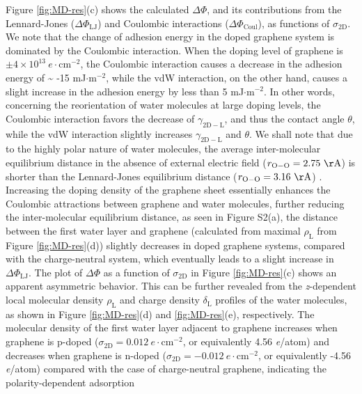 \documentclass[journal=langd5,manuscript=article,email=true,hyperref=true,keywords=true]{achemso}
\begin{document}
Figure \ref{fig:MD-res}(c) shows the calculated \(\Delta \Phi\), and
its contributions from the Lennard-Jones (\(\Delta \Phi_{\mathrm{LJ}}\))
and Coulombic interactions (\(\Delta \Phi_{\mathrm{Coul}}\)), as
functions of \(\sigma_{\mathrm{2D}}\). We note that the change of
adhesion energy in the doped graphene system is dominated by the
Coulombic interaction. When the doping level of graphene is \(\pm 4
\times 10^{13}\ e\cdot \mathrm{cm}^{-2}\), the Coulombic interaction
causes a decrease in the adhesion energy of \textasciitilde{} -15 mJ\(\cdot
\mathrm{m}^{-2}\), while the vdW interaction, on the other hand, causes
a slight increase in the adhesion energy by less than 5 mJ\(\cdot
\mathrm{m}^{-2}\). In other words, concerning the reorientation of
water molecules at large doping levels, the Coulombic interaction
favors the decrease of \(\gamma_{\mathrm{2D-L}}\), and thus the contact
angle \(\theta\), while the vdW interaction slightly increases
\(\gamma_{\mathrm{2D-L}}\) and \(\theta\). We shall note that due to the
highly polar nature of water molecules, the average inter-molecular
equilibrium distance in the absence of external electric field
(\(r_{\mathrm{O-O}}=2.75\ \mathrm{\AA}\)) is shorter than the
Lennard-Jones equilibrium distance (\(r_{\mathrm{O-O}}=3.16\
\mathrm{\AA}\)) \cite{Mark_2001}. Increasing the doping density of the
graphene sheet essentially enhances the Coulombic attractions between
graphene and water molecules, further reducing the inter-molecular
equilibrium distance, as seen in Figure S2(a), the distance between
the first water layer and graphene (calculated from maximal
\(\rho_{\mathrm{L}}\) from Figure \ref{fig:MD-res}(d)) slightly decreases
in doped graphene systems, compared with the charge-neutral system,
which eventually leads to a slight increase in \(\Delta
\Phi_{\mathrm{LJ}}\).  The plot of \(\Delta \Phi\) as a function of
\(\sigma_{\mathrm{2D}}\) in Figure \ref{fig:MD-res}(c) shows an apparent
asymmetric behavior. This can be further revealed from the
\emph{z}-dependent local molecular density \(\rho_{\mathrm{L}}\) and charge
density \(\delta_{\mathrm{L}}\) profiles of the water molecules, as
shown in Figure \ref{fig:MD-res}(d) and \ref{fig:MD-res}(e),
respectively. The molecular density of the first water layer adjacent
to graphene increases when graphene is p-doped
(\(\sigma_{\mathrm{2D}}=0.012\ e\cdot \mathrm{cm}^{-2}\), or
equivalently 4.56 \textit{e}/atom) and decreases when graphene is
n-doped (\(\sigma_{\mathrm{2D}}=-0.012\ e\cdot \mathrm{cm}^{-2}\), or
equivalently -4.56 \textit{e}/atom) compared with the case of
charge-neutral graphene, indicating the polarity-dependent adsorption
\end{document}
